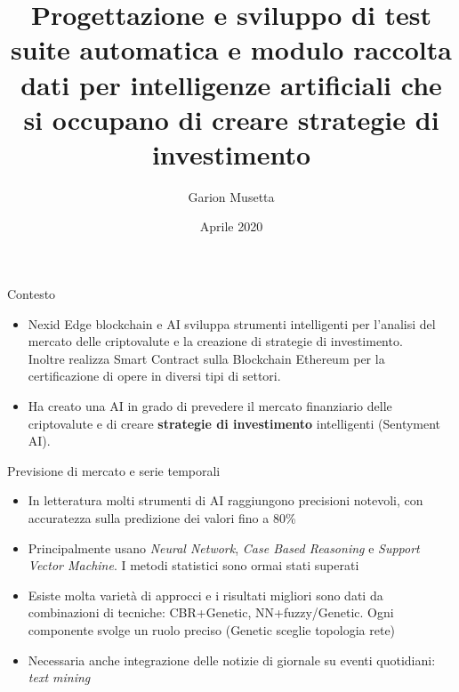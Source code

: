 \documentclass{beamer}
\title[Trading AI]{Progettazione e sviluppo di test suite automatica e modulo raccolta dati per intelligenze artificiali che si occupano di creare strategie di investimento}
\author{Garion Musetta}
\date{Aprile 2020}
\begin{document}
\maketitle

\begin{frame}{Contesto}
\begin{itemize}
\item Nexid Edge blockchain e AI sviluppa strumenti intelligenti per l’analisi del mercato delle criptovalute e
la creazione di strategie di investimento.\\ Inoltre realizza Smart Contract sulla Blockchain Ethereum per la certificazione di opere in diversi tipi di settori.
\item Ha creato una AI in grado di prevedere il mercato finanziario delle criptovalute e di creare \textbf{strategie di investimento} intelligenti (Sentyment AI).
\end{itemize}
\begin{figure}
\end{figure}
\end{frame}

\begin{frame}{Previsione di mercato e serie temporali}
\begin{itemize}
\item In letteratura molti strumenti di AI raggiungono precisioni notevoli, con accuratezza sulla predizione dei valori fino a 80\%
\item Principalmente usano \textit{Neural Network}, \textit{Case Based Reasoning} e \textit{Support Vector Machine}. I metodi statistici sono ormai stati superati
\item Esiste molta varietà di approcci e i risultati migliori sono dati da combinazioni di tecniche: CBR+Genetic, NN+fuzzy/Genetic. Ogni componente svolge un ruolo preciso (Genetic sceglie topologia rete)
\item Necessaria anche integrazione delle notizie di giornale su eventi quotidiani: \textit{text mining}
\end{itemize}
\end{frame}
\end{document}
